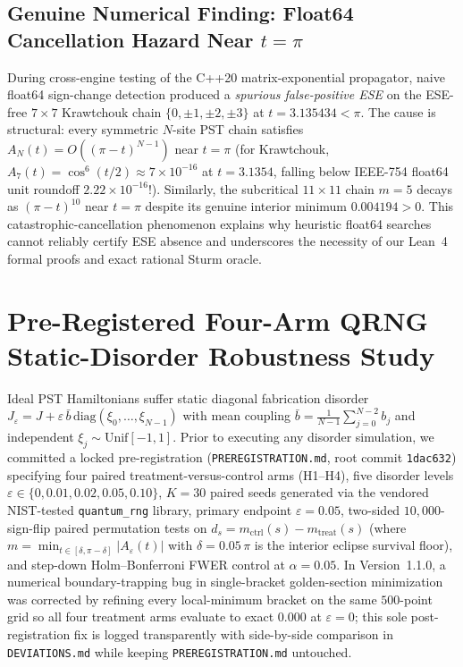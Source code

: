 \documentclass[11pt,reqno]{amsart}
\theoremstyle{definition}
\newcommand{\id}[1]{\textnormal{\texttt{\small #1}}}
\begin{document}
\subsection{Genuine Numerical Finding: Float64 Cancellation Hazard Near \texorpdfstring{$t=\pi$}{t=pi}}

During cross-engine testing of the C++20 matrix-exponential propagator, naive float64 sign-change detection produced a \emph{spurious false-positive ESE} on the ESE-free $7\times 7$ Krawtchouk chain $\{0,\pm 1,\pm 2,\pm 3\}$ at $t=3.135434<\pi$. The cause is structural: every symmetric $N$-site PST chain satisfies $A_N(t) = O((\pi-t)^{N-1})$ near $t=\pi$ (for Krawtchouk, $A_7(t)=\cos^6(t/2)\approx 7\times 10^{-16}$ at $t=3.1354$, falling below IEEE-754 float64 unit roundoff $2.22\times 10^{-16}$!). Similarly, the subcritical $11\times 11$ chain $m=5$ decays as $(\pi-t)^{10}$ near $t=\pi$ despite its genuine interior minimum $0.004194>0$. This catastrophic-cancellation phenomenon explains why heuristic float64 searches cannot reliably certify ESE absence and underscores the necessity of our Lean~4 formal proofs and exact rational Sturm oracle.

\section{Pre-Registered Four-Arm QRNG Static-Disorder Robustness Study}
\label{sec:qrng}

Ideal PST Hamiltonians suffer static diagonal fabrication disorder $J_\varepsilon = J + \varepsilon\,\bar{b}\,\mathrm{diag}(\xi_0,\dots,\xi_{N-1})$ with mean coupling $\bar{b}=\frac{1}{N-1}\sum_{j=0}^{N-2} b_j$ and independent $\xi_j\sim\mathrm{Unif}[-1,1]$. Prior to executing any disorder simulation, we committed a locked pre-registration (\id{PREREGISTRATION.md}, root commit \id{1dac632}) specifying four paired treatment-versus-control arms (H1--H4), five disorder levels $\varepsilon\in\{0,0.01,0.02,0.05,0.10\}$, $K=30$ paired seeds generated via the vendored NIST-tested \id{quantum\_rng} library, primary endpoint $\varepsilon=0.05$, two-sided $10{,}000$-sign-flip paired permutation tests on $d_s = m_{\mathrm{ctrl}}(s)-m_{\mathrm{treat}}(s)$ (where $m=\min_{t\in[\delta,\pi-\delta]}|A_\varepsilon(t)|$ with $\delta=0.05\,\pi$ is the interior eclipse survival floor), and step-down Holm--Bonferroni FWER control at $\alpha=0.05$. In Version~1.1.0, a numerical boundary-trapping bug in single-bracket golden-section minimization was corrected by refining every local-minimum bracket on the same $500$-point grid so all four treatment arms evaluate to exact $0.000$ at $\varepsilon=0$; this sole post-registration fix is logged transparently with side-by-side comparison in \id{DEVIATIONS.md} while keeping \id{PREREGISTRATION.md} untouched.
\end{document}
